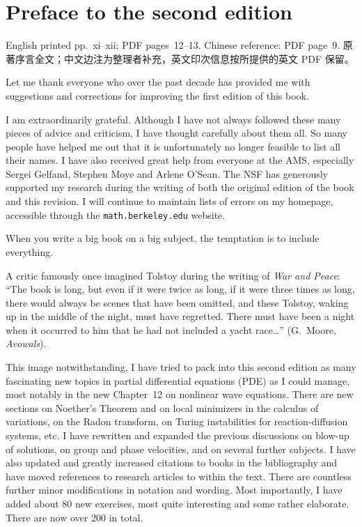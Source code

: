 \chapter*{Preface to the second edition}
%
  {English printed pp.~xi--xii; PDF pages~12--13.
   Chinese reference: PDF page~9.\newline
   原著序言全文；中文边注为整理者补充，英文印次信息按所提供的英文 PDF 保留。}

Let me thank everyone who over the past decade has provided me with suggestions
and corrections for improving the first edition of this book.%

I am extraordinarily
grateful. Although I have not always followed these many pieces of advice and
criticism, I have thought carefully about them all. So many people have helped
me out that it is unfortunately no longer feasible to list all their names. I have
also received great help from everyone at the AMS, especially Sergei Gelfand,
Stephen Moye and Arlene O'Sean. The NSF has generously supported my research
during the writing of both the original edition of the book and this revision.
I will continue to maintain lists of errors on my homepage, accessible through
the \texttt{math.berkeley.edu} website.

When you write a big book on a big subject, the temptation is to include
everything.%

A critic famously once imagined Tolstoy during the writing of
\emph{War and Peace}: ``The book is long, but even if it were twice as long,
if it were three times as long, there would always be scenes that have been
omitted, and these Tolstoy, waking up in the middle of the night, must have
regretted. There must have been a night when it occurred to him that he had
not included a yacht race\ldots'' (G.~Moore, \emph{Avowals}).

This image notwithstanding,%
I have tried to pack into this second edition as
many fascinating new topics in partial differential equations (PDE) as I could
manage, most notably in the new Chapter~12 on nonlinear wave equations.
There are new sections on Noether's Theorem and on local minimizers in the
calculus of variations, on the Radon transform, on Turing instabilities for
reaction-diffusion systems, etc. I have rewritten and expanded the previous
discussions on blow-up of solutions, on group and phase velocities, and on
several further subjects. I have also updated and greatly increased citations
to books in the bibliography and have moved references to research articles
to within the text. There are countless further minor modifications in notation
and wording. Most importantly, I have added about 80 new exercises, most quite
interesting and some rather elaborate. There are now over 200 in total.

